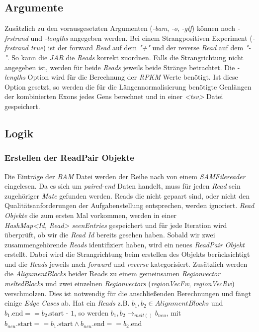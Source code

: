 \documentclass[12pt]{article}
\begin{document}
\subsection{Argumente}
Zusätzlich zu den vorausgesetzten Argumenten (\textit{-bam}, \textit{-o}, \textit{-gtf}) können noch \textit{-frstrand} und
\textit{-lengths} angegeben werden. 
Bei einem Strangpositiven Experiment (\textit{-frstrand true}) ist der forward \textit{Read} auf dem \textit{"+"} und der reverse \textit{Read} auf dem
\textit{"-"}. So kann die \textit{JAR} die \textit{Reads} korrekt zuordnen. 
Falls die Strangrichtung nicht angegeben ist, werden für beide \textit{Reads} jeweils beide Stränge betrachtet.
Die \textit{-lengths} Option wird für die Berechnung der \textit{RPKM} Werte benötigt. 
Ist diese Option gesetzt, so werden die für die Längennormalisierung benötigte Genlängen der kombinierten Exons jedes
Gens berechnet und in einer \textit{<tsv>} Datei gespeichert.
\subsection{Logik}
\subsubsection{Erstellen der ReadPair Objekte}

Die Einträge der \textit{BAM} Datei werden der Reihe nach von einem \textit{SAMFilereader} eingelesen. Da es
sich um \textit{paired-end} Daten handelt, muss für jeden \textit{Read} sein zugehöriger \textit{Mate} gefunden werden. 
Reads die nicht gepaart sind, oder nicht den Qualitätsanforderungen der Aufgabenstellung entsprechen,
werden ignoriert.
\textit{Read Objekte} die zum ersten Mal vorkommen, werden in einer \\ \textit{HashMap<Id, Read> seenEntries}
gespeichert und für jede Iteration wird überprüft, ob wir die \textit{Read Id} bereits gesehen haben.
Sobald wir zwei zusammengehörende \textit{Reads} identifiziert haben, wird ein neues
\textit{ReadPair Objekt} erstellt. Dabei wird die Strangrichtung beim erstellen des Objekts berücksichtigt und
die \textit{Reads} jeweils nach \textit{forward} und \textit{reverse} kategorisiert.
Zusätzlich werden die \textit{AlignmentBlocks} beider Reads zu einem gemeinsamen \textit{Regionvector meltedBlocks} und
zwei einzelnen \textit{Regionvectors} (\textit{regionVecFw}, \textit{regionVecRw}) verschmolzen.
Dies ist notwendig für die anschlie\ss enden Berechnungen und fängt einige \textit{Edge Cases} ab.
Hat ein \textit{Reads} z.B. $b_{1}, b_{2} \in AlignmentBlocks$ und $b_{1}.\text{end} == b_{2}.\text{start - 1}$,
so werden $b_{1}, b_{2} \rightarrow_{melt()} b_{neu}$, mit $b_{neu}.\text{start} == b_{1}.\text{start} \land b_{neu}.\text{end} == b_{2}.\text{end}$
\newpage
\end{document}
